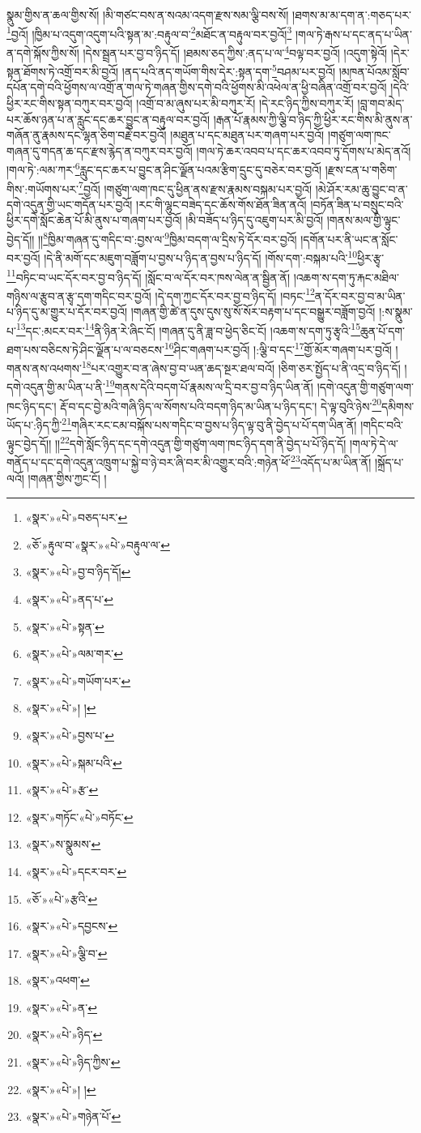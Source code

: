 སྣུམ་གྱིས་ན་ཆལ་གྱིས་སོ། །མི་གཙང་བས་ན་སའམ་འདག་རྫས་སམ་ལྕི་བས་སོ། །ཐགས་མ་མ་དག་ན་:གཅད་པར་\footnote{«སྣར་»«པེ་»བཅད་པར་}བྱའོ། །ཁྱིམ་པ་འདུག་འདུག་པའི་སྟན་མ་:བརྟུལ་བ་\footnote{«ཅོ་»རྟུལ་བ་«སྣར་»«པེ་»བརྟུལ་ལ་}མཐོང་ན་བརྟུལ་བར་བྱའོ།\footnote{«སྣར་»«པེ་»བྱ་བ་ཉིད་དོ།} །གལ་ཏེ་རྒས་པ་དང་ནད་པ་ཡིན་ན་དགེ་སྐོས་ཀྱིས་སོ། །དེས་སྦྲན་པར་བྱ་བ་ཉིད་དོ། །ཐམས་ཅད་ཀྱིས་:ནད་པ་ལ་\footnote{«སྣར་»«པེ་»ནད་པ་}བལྟ་བར་བྱའོ། །འདུག་སྟེའོ། །དེར་སྟན་ཐོགས་ཏེ་འགྲོ་བར་མི་བྱའོ། །ནད་པའི་ནད་གཡོག་གིས་དེར་:སྟན་དག་\footnote{«སྣར་»«པེ་»སྟན་}བཤམ་པར་བྱའོ། །མཁན་པོའམ་སློབ་དཔོན་དགེ་བའི་ཕྱོགས་ལ་འགྲོ་ན་གལ་ཏེ་གཞན་གྱིས་དགེ་བའི་ཕྱོགས་མི་འཕེལ་ན་ཕྱི་བཞིན་འགྲོ་བར་བྱའོ། །དེའི་ཕྱིར་རང་གིས་སྟན་བཀུར་བར་བྱའོ། །འགྲོ་བ་མ་ཞུས་པར་མི་བཀུར་རོ། །དེ་རང་ཉིད་ཀྱིས་བཀུར་རོ། །བླ་གབ་མེད་པར་ཆོས་ཉན་པ་ན་རླུང་དང་ཆར་བྱུང་ན་བརྟུལ་བར་བྱའོ། །རྒན་པོ་རྣམས་ཀྱི་ལྕི་བ་ཉིད་ཀྱི་ཕྱིར་རང་གིས་མི་ནུས་ན་གཞོན་ནུ་རྣམས་དང་ལྷན་ཅིག་བརྗེ་བར་བྱའོ། །མཐུན་པ་དང་མཐུན་པར་གཞག་པར་བྱའོ། །གཙུག་ལག་ཁང་གཞན་དུ་གདན་ཆ་དང་རྫས་རྙེད་ན་བཀུར་བར་བྱའོ། །གལ་ཏེ་ཆར་འབབ་པ་དང་ཆར་འབབ་ཏུ་དོགས་པ་མེད་ནའོ། །གལ་ཏེ་:ལམ་ཀར་\footnote{«སྣར་»«པེ་»ལམ་གར་}རླུང་དང་ཆར་པ་བྱུང་ན་ཤིང་ལྗོན་པའམ་རྩིག་དྲུང་དུ་བཅེར་བར་བྱའོ། །རྫས་ངན་པ་གཅིག་གིས་:གཡོགས་པར་\footnote{«སྣར་»«པེ་»གཡོག་པར་}བྱའོ། །གཙུག་ལག་ཁང་དུ་ཕྱིན་ནས་རྫས་རྣམས་བསྐམ་པར་བྱའོ། །མེ་ཤོར་རམ་ཆུ་བྱུང་བ་ན་དགེ་འདུན་གྱི་ཡང་གདོན་པར་བྱའོ། །རང་གི་ལྷུང་བཟེད་དང་ཆོས་གོས་ཐོན་ཟིན་ནའོ། །བཏོན་ཟིན་པ་བསྲུང་བའི་ཕྱིར་དགེ་སློང་ཆེན་པོ་མི་ནུས་པ་གཞག་པར་བྱའོ། །མི་བཟོད་པ་ཉིད་དུ་འཇུག་པར་མི་བྱའོ། །གནས་མལ་གྱི་ལྟུང་བྱེད་དོ།། །།\footnote{«སྣར་»«པེ་»། །}ཁྱིམ་གཞན་དུ་གདིང་བ་:བྱས་ལ་\footnote{«སྣར་»«པེ་»བྱས་པ་}ཁྱིམ་བདག་ལ་དྲིས་ཏེ་དོར་བར་བྱའོ། །དགོན་པར་ནི་ཡང་ན་སློང་བར་བྱའོ། །དེ་ནི་མགོ་དང་མཇུག་བཟློག་པ་བྱས་པ་ཉིད་ན་བྱས་པ་ཉིད་དོ། །གོས་དག་:བསྐམ་པའི་\footnote{«སྣར་»«པེ་»སྐམ་པའི་}ཕྱིར་རྩྭ་\footnote{«སྣར་»«པེ་»རྩ་}བཏིང་བ་ཡང་དོར་བར་བྱ་བ་ཉིད་དོ། །སློང་བ་ལ་དོར་བར་ཁས་ལེན་ན་སྦྱིན་ནོ། །འཆག་ས་དག་ཏུ་རྐང་མཐིལ་གཉིས་ལ་རྩུབ་ན་རྩྭ་དག་གདིང་བར་བྱའོ། །དེ་དག་ཀྱང་དོར་བར་བྱ་བ་ཉིད་དོ། །བཏང་\footnote{«སྣར་»གཏོང་«པེ་»བཏོང་}ན་དོར་བར་བྱ་བ་མ་ཡིན་པ་ཉིད་དུ་མ་གྱུར་པ་དོར་བར་བྱའོ། །གཞན་གྱི་ཚེ་ན་དུས་དུས་སུ་སོ་སོར་བརྟག་པ་དང་བསྒྱུར་བཟློག་བྱའོ། །:ས་སྣུམ་པ་\footnote{«སྣར་»ས་སྣུམས་}དང་:མངར་བར་\footnote{«སྣར་»«པེ་»དངར་བར་}ནི་ཉིན་རེ་ཞིང་ངོ། །གཞན་དུ་ནི་ཟླ་བ་ཕྱེད་ཅིང་ངོ། །འཆག་ས་དག་ཏུ་རྩྭའི་\footnote{«ཅོ་»«པེ་»རྩའི་}ཆུན་པོ་དག་ཐག་པས་བཅིངས་ཏེ་ཤིང་ལྗོན་པ་ལ་བཅངས་\footnote{«སྣར་»«པེ་»དབྱངས་}ཤིང་གཞག་པར་བྱའོ། །:ལྕི་བ་དང་\footnote{«སྣར་»«པེ་»ལྕི་བ་}གྱོ་མོར་གཞག་པར་བྱའོ། །གནས་ནས་འཕགས་\footnote{«སྣར་»འཕག་}པར་འགྱུར་བ་ན་ཞེས་བྱ་བ་ཡན་ཆད་སྔར་ཐལ་བའོ། །ཅིག་ཅར་སྤྱོད་པ་ནི་འདྲ་བ་ཉིད་དོ། །དགེ་འདུན་གྱི་མ་ཡིན་པ་ནི་\footnote{«སྣར་»«པེ་»ན་}གནས་དེའི་བདག་པོ་རྣམས་ལ་དྲི་བར་བྱ་བ་ཉིད་ཡིན་ནོ། །དགེ་འདུན་གྱི་གཙུག་ལག་ཁང་ཉིད་དང་། རྡོ་བ་དང་བྱེ་མའི་གཞི་ཉིད་ལ་སོགས་པའི་བདག་ཉིད་མ་ཡིན་པ་ཉིད་དང་། དེ་ལྟ་བུའི་ཉེས་\footnote{«སྣར་»«པེ་»ཉིད་}དམིགས་ཡོད་པ་:ཉིད་ཀྱི་\footnote{«སྣར་»«པེ་»ཉིད་ཀྱིས་}གཞིར་རང་ངམ་བསྐོས་པས་གདིང་བ་བྱས་པ་ཉིད་ལྟ་བུ་ནི་བྱེད་པ་པོ་དག་ཡིན་ནོ། །གདིང་བའི་ལྟུང་བྱེད་དོ།། །།\footnote{«སྣར་»«པེ་»། །}དགེ་སློང་ཉིད་དང་དགེ་འདུན་གྱི་གཙུག་ལག་ཁང་ཉིད་དག་ནི་བྱེད་པ་པོ་ཉིད་དོ། །གལ་ཏེ་དེ་ལ་གནོད་པ་དང་དགེ་འདུན་འཁྲུག་པ་སྐྱེ་བ་ཉེ་བར་ཞི་བར་མི་འགྱུར་བའི་:གཉེན་ཕོ་\footnote{«སྣར་»«པེ་»གཉེན་པོ་}འདོད་པ་མ་ཡིན་ནོ། །སྐྲོད་པ་ལའོ། །གཞན་གྱིས་ཀྱང་ངོ། །
